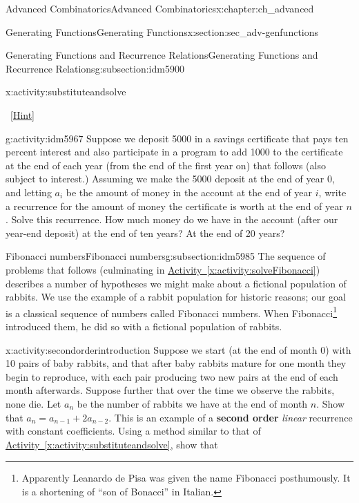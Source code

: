 \documentclass[oneside,10pt,]{book}
\newcommand{\terminology}[1]{\textbf{#1}}
\numberwithin{equation}{chapter}
\begin{document}
\begin{chapterptx}{Advanced Combinatorics}{}{Advanced Combinatorics}{}{}{x:chapter:ch_advanced}
\begin{sectionptx}{Generating Functions}{}{Generating Functions}{}{}{x:section:sec_adv-genfunctions}
\begin{subsectionptx}{Generating Functions and Recurrence Relations}{}{Generating Functions and Recurrence Relations}{}{}{g:subsection:idm5900}
\begin{activity}{}{x:activity:substituteandsolve}
\begin{enumerate}[font=\bfseries,label=(\alph*),ref=\alph*]
\qquad~\hfill{\tiny\hyperlink{g:hint:idm5948-back}{[Hint]}}\end{enumerate}
\end{activity}
\begin{activity}{}{g:activity:idm5967}%
Suppose we deposit \textdollar{}5000 in a savings certificate that pays ten percent interest and also participate in a program to add \textdollar{}1000 to the certificate at the end of each year (from the end of the first year on) that follows (also subject to interest.) Assuming we make the \textdollar{}5000 deposit at the end of year 0, and letting \(a_i\) be the amount of money in the account at the end of year \(i\), write a recurrence for the amount of money the certificate is worth at the end of year \(n\). Solve this recurrence. How much money do we have in the account (after our year-end deposit) at the end of ten years?  At the end of 20 years?%
\end{activity}
\end{subsectionptx}
%
%
\typeout{************************************************}
\typeout{************************************************}
%
\begin{subsectionptx}{Fibonacci numbers}{}{Fibonacci numbers}{}{}{g:subsection:idm5985}
The sequence of problems that follows (culminating in \hyperref[x:activity:solveFibonacci]{Activity~\ref{x:activity:solveFibonacci}}) describes a number of hypotheses we might make about a fictional population of rabbits. We use the example of a rabbit population for historic reasons; our goal is a classical sequence of numbers called Fibonacci numbers. When Fibonacci\footnote{Apparently Leanardo de Pisa was given the name Fibonacci posthumously. It is a shortening of ``son of Bonacci'' in Italian.\label{g:fn:idm5989}} introduced them, he did so with a fictional population of rabbits.%
\begin{activity}{}{x:activity:secondorderintroduction}%
Suppose we start (at the end of month 0) with 10 pairs of baby rabbits, and that after baby rabbits mature for one month they begin to reproduce, with each pair producing two new pairs at the end of each month afterwards. Suppose further that over the time we observe the rabbits, none die. Let \(a_n\) be the number of rabbits we have at the end of month \(n\). Show that \(a_n=a_{n-1} + 2a_{n-2}\). This is an example of a \terminology{second order} \emph{linear} recurrence with constant coefficients. Using a method similar to that of \hyperref[x:activity:substituteandsolve]{Activity~\ref{x:activity:substituteandsolve}}, show that%

\end{activity}
\end{subsectionptx}
\end{sectionptx}
\end{chapterptx}
\end{document}
